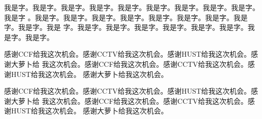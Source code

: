 \documentclass[supercite]{HustGraduPaper}
\theoremstyle{definition}
\begin{document}
我是字。我是字。我是字。我是字。我是字。我是字。我是字。我是字。我是字。我是字
。我是字。我是字。我是字。我是字。我是字。我是字。我是字。我是字。我是字。我是
字。我是字。我是字。我是字。我是字。我是字。我是字。我是字。我是字。

\begin{thankpage}

感谢CCF给我这次机会。感谢CCTV给我这次机会。感谢HUST给我这次机会。感谢大萝卜给
我这次机会。感谢CCF给我这次机会。感谢CCTV给我这次机会。感谢HUST给我这次机会。
感谢大萝卜给我这次机会。

感谢CCF给我这次机会。感谢CCTV给我这次机会。感谢HUST给我这次机会。感谢大萝卜给
我这次机会。感谢CCF给我这次机会。感谢CCTV给我这次机会。感谢HUST给我这次机会。
感谢大萝卜给我这次机会。

\end{thankpage}

\nocite{*}


\end{document}
